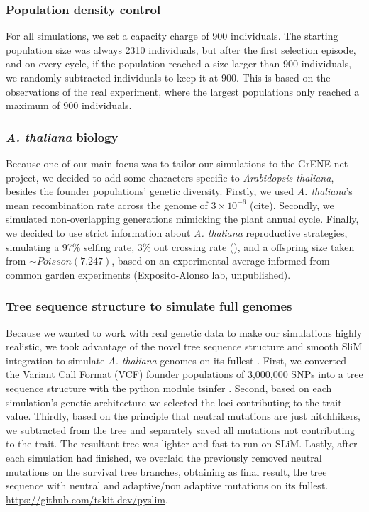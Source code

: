 \documentclass{article}
\begin{document}
\subsubsection{Population density control}
For all simulations, we set a capacity charge of 900 individuals. The starting population size was always 2310 individuals, but after the first selection episode, and on every cycle, if the population reached a size larger than 900 individuals, we randomly subtracted individuals to keep it at 900. This is based on the observations of the real experiment, where the largest populations only reached a maximum of 900 individuals. 

\subsubsection{\textit{A. thaliana} biology}
Because one of our main focus was to tailor our simulations to the GrENE-net project, we decided to add some characters specific to \textit{Arabidopsis thaliana}, besides the founder populations' genetic diversity. Firstly, we used \textit{A. thaliana}'s mean recombination rate across the genome of $3 \times 10^{-6}$ (cite). Secondly, we simulated non-overlapping generations mimicking the plant annual cycle. Finally, we decided to use strict information about \textit{A. thaliana} reproductive strategies, simulating a 97\% selfing rate, 3\% out crossing rate (\citep{Platt2010-hy}), and a offspring size taken from $\sim Poisson(7.247)$,  based on an experimental average informed from common garden experiments (Exposito-Alonso lab, unpublished). 

\subsubsection{Tree sequence structure to simulate full genomes}
Because we wanted to work with real genetic data to make our simulations highly realistic, we took advantage of the novel tree sequence structure and smooth SliM integration to simulate \textit{A. thaliana} genomes on its fullest \citep{Kelleher2018-jb, Haller2019-lm}. First, we converted the Variant Call Format (VCF) founder populations of 3,000,000 SNPs  into a tree sequence structure with the python module tsinfer \citep{Kelleher2019-ev}. Second, based on each simulation's genetic architecture we selected the loci contributing to the trait value. Thirdly, based on the principle that neutral mutations are just hitchhikers, we subtracted from the tree and separately saved all mutations not contributing to the trait. The resultant tree was lighter and fast to run on SLiM. Lastly, after each simulation had finished, we overlaid the previously removed neutral mutations on the survival tree branches, obtaining as final result, the tree sequence with neutral and adaptive/non adaptive mutations on its fullest. 
\url{https://github.com/tskit-dev/pyslim}. 
\end{document}
